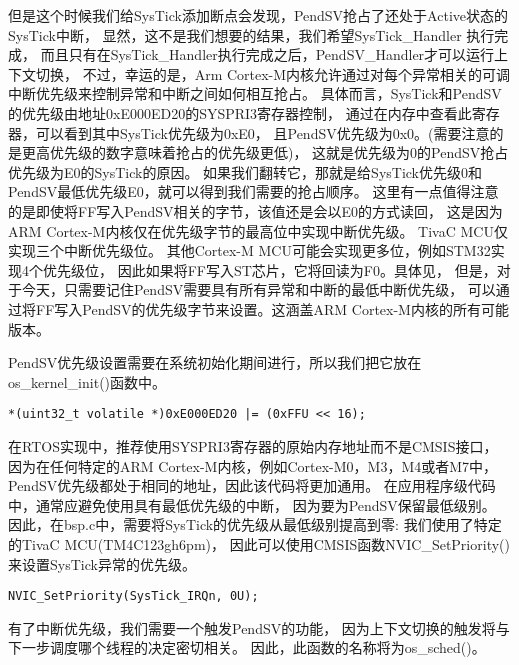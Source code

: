 但是这个时候我们给SysTick添加断点会发现，PendSV抢占了还处于Active状态的SysTick中断，
显然，这不是我们想要的结果，我们希望SysTick\_Handler 执行完成，
而且只有在SysTick\_Handler执行完成之后，PendSV\_Handler才可以运行上下文切换，
不过，幸运的是，Arm Cortex-M内核允许通过对每个异常相关的可调中断优先级来控制异常和中断之间如何相互抢占。
具体而言，SysTick和PendSV的优先级由地址0xE000ED20的SYSPRI3寄存器控制，
通过在内存中查看此寄存器，可以看到其中SysTick优先级为0xE0，
且PendSV优先级为0x0。(需要注意的是更高优先级的数字意味着抢占的优先级更低)，
这就是优先级为0的PendSV抢占优先级为E0的SysTick的原因。
如果我们翻转它，那就是给SysTick优先级0和PendSV最低优先级E0，就可以得到我们需要的抢占顺序。
这里有一点值得注意的是即使将FF写入PendSV相关的字节，该值还是会以E0的方式读回，
这是因为ARM Cortex-M内核仅在优先级字节的最高位中实现中断优先级。
TivaC MCU仅实现三个中断优先级位。
其他Cortex-M MCU可能会实现更多位，例如STM32实现4个优先级位，
因此如果将FF写入ST芯片，它将回读为F0。具体见\cite{interrupt_priority}，
但是，对于今天，只需要记住PendSV需要具有所有异常和中断的最低中断优先级，
可以通过将FF写入PendSV的优先级字节来设置。这涵盖ARM Cortex-M内核的所有可能版本。

PendSV优先级设置需要在系统初始化期间进行，所以我们把它放在os\_kernel\_init()函数中。
\begin{lstlisting}[language={[ANSI]C},keywordstyle=\color{blue!70},commentstyle=\color{red!50!green!50!blue!50},frame=shadowbox, rulesepcolor=\color{red!20!green!20!blue!20}]
    *(uint32_t volatile *)0xE000ED20 |= (0xFFU << 16);
\end{lstlisting}
在RTOS实现中，推荐使用SYSPRI3寄存器的原始内存地址而不是CMSIS接口，
因为在任何特定的ARM Cortex-M内核，例如Cortex-M0，M3，M4或者M7中，
PendSV优先级都处于相同的地址，因此该代码将更加通用。
在应用程序级代码中，通常应避免使用具有最低优先级的中断，
因为要为PendSV保留最低级别。
因此，在bsp.c中，需要将SysTick的优先级从最低级别提高到零:
我们使用了特定的TivaC MCU(TM4C123gh6pm)，
因此可以使用CMSIS函数NVIC\_SetPriority()来设置SysTick异常的优先级。
\begin{lstlisting}[language={[ANSI]C},keywordstyle=\color{blue!70},commentstyle=\color{red!50!green!50!blue!50},frame=shadowbox, rulesepcolor=\color{red!20!green!20!blue!20}]
    NVIC_SetPriority(SysTick_IRQn, 0U);
\end{lstlisting}

有了中断优先级，我们需要一个触发PendSV的功能，
因为上下文切换的触发将与下一步调度哪个线程的决定密切相关。
因此，此函数的名称将为os\_sched()。

